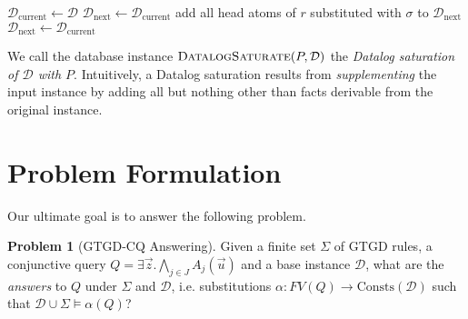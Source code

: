 \documentclass[12pt]{report}
\theoremstyle{plain}
\theoremstyle{definition}
\newtheorem{problem}[theorem]{Problem}
\def\Consts{{\mathrm{Consts}}}
\begin{document}
\begin{algorithm}
\caption{Answering Datalog query using Naive Evaluation}
\begin{algorithmic}[1]
  \State $\mathcal{D}_\mathrm{current} \gets \mathcal{D}$
    \State $\mathcal{D}_\mathrm{next} \gets \mathcal{D}_\mathrm{current}$
        \State add all head atoms of $r$ substituted with $\sigma$ to $\mathcal{D}_\mathrm{next}$
      \EndFor
    \EndFor
    \State
      \State $\mathcal{D}_\mathrm{next} \gets \mathcal{D}_\mathrm{current}$
    \Else
      \State {}
    \EndIf
  \EndWhile
\EndProcedure
\State
{}
  \State {}
\EndProcedure
\end{algorithmic}
\end{algorithm}

We call the database instance $\textsc{DatalogSaturate}(P, \mathcal{D})$ the \emph{Datalog saturation of $\mathcal{D}$ with $P$}. Intuitively, a Datalog saturation results from \emph{supplementing} the input instance by adding all but nothing other than facts derivable from the original instance.

\section{Problem Formulation}

Our ultimate goal is to answer the following problem.

\begin{problem}[GTGD-CQ Answering]
\label{GTGD-CQ-Answering}
  Given a finite set $\Sigma$ of GTGD rules, a conjunctive query $Q = \exists \vec{z}. \bigwedge_{j \in J} A_j(\vec{u})$ and a base instance $\mathcal{D}$, what are the \emph{answers} to $Q$ under $\Sigma$ and $\mathcal{D}$, i.e. substitutions $\alpha: FV(Q) \rightarrow \Consts(\mathcal{D})$ such that $\mathcal{D} \cup \Sigma \models \alpha(Q)$?
\end{problem}

\end{document}
